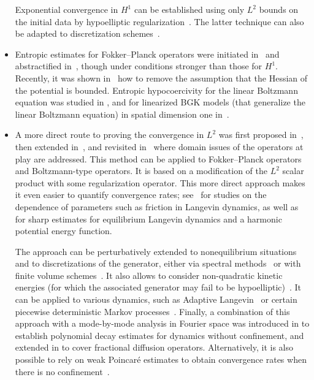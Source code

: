 \documentclass{article}
\begin{document}
\begin{itemize}
 Exponential convergence  in $H^1$ can be established using only $L^2$ bounds on the initial data by hypoelliptic regularization~\cite{Herau07}. The latter technique can also be adapted to discretization schemes~\cite{PZ17}.

\item Entropic estimates for Fokker--Planck operators were initiated in~\cite{DV01} and abstractified in~\cite{Villani09}, though under conditions stronger than those for $H^1$. Recently, it was shown in~\cite{CGMZ19} how to remove the assumption that the Hessian of the potential is bounded. Entropic hypocoercivity for the linear Boltzmann equation was studied in \cite{Ev17, Mon17}, and for linearized BGK models (that generalize the linear Boltzmann equation) in spatial dimension one in~\cite{AAC16}.
  
\item A more direct route to proving the convergence in $L^2$ was first proposed in~\cite{Herau06}, then extended in~\cite{DMS09,DMS15}, and revisited in~\cite{GS16} where domain issues of the operators at play are addressed. This method can be applied to Fokker--Planck operators and Boltzmann-type operators. It is based on a modification of the $L^2$ scalar product with some regularization operator. This more direct approach makes it even easier to quantify convergence rates; see~\cite{DKMS13,GS16} for studies on the dependence of parameters such as friction in Langevin dynamics, as well as~\cite{AAS15,ASS20} for sharp estimates for equilibrium Langevin dynamics and a harmonic potential energy function.

The approach can be perturbatively extended to nonequilibrium situations~\cite{BHM17,SV18,IOS19} and to discretizations of the generator, either via spectral methods~\cite{RS18} or with finite volume schemes~\cite{BCHR19}. It also allows to consider non-quadratic kinetic energies (for which the associated generator may fail to be hypoelliptic)~\cite{ST18}. It can be applied to various dynamics, such as Adaptive Langevin~\cite{LSS19} or certain piecewise deterministic Markov processes~\cite{ADNR18}. Finally, a combination of this approach with a mode-by-mode analysis in Fourier space was introduced in \cite{BDMMS17} to establish polynomial decay estimates for dynamics without confinement, and extended in \cite{BDLS19} to cover fractional diffusion operators. Alternatively, it is also possible to rely on weak Poincar\'e estimates to obtain convergence rates when there is no confinement~\cite{GW19}.


\end{itemize}
\end{document}
